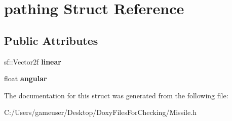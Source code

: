 \hypertarget{structpathing}{}\section{pathing Struct Reference}
\label{structpathing}
\subsection*{Public Attributes}
\begin{DoxyCompactItemize}
\item 
\mbox{\label{structpathing_a9683af0c180406d960b0a97fce3a4e2a}} 
sf\+::\+Vector2f {\bfseries linear}
\item 
\mbox{\label{structpathing_a3d2b12c0ed5b6d148fb5e1683a884dfb}} 
float {\bfseries angular}
\end{DoxyCompactItemize}


The documentation for this struct was generated from the following file\+:\begin{DoxyCompactItemize}
\item 
C\+:/\+Users/gameuser/\+Desktop/\+Doxy\+Files\+For\+Checking/Missile.\+h\end{DoxyCompactItemize}
